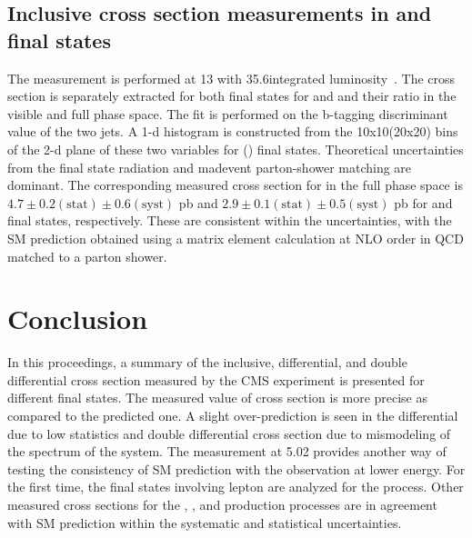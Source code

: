  \subsection{Inclusive \texorpdfstring{\ttbb}{ttbb} cross section measurements in \texorpdfstring{\ljets}{ljets} and \texorpdfstring{\dilep}{dilep} final states}
 The measurement is performed at 13 \TeV with 35.6\fbinv integrated luminosity~\cite{CMS:2020grm}. 
 The cross section is separately extracted for both final states for \ttbar and \ttjj and their ratio
 in the visible and full phase space. The fit is performed on the b-tagging discriminant value of 
 the two jets. A 1-d histogram is constructed from the 10x10(20x20) bins of the 2-d plane of these 
 two variables for \ljets (\dilep) final states. Theoretical uncertainties from the final state
 radiation and madevent parton-shower matching are dominant. The corresponding measured cross
 section for \ttbb in the full phase space is $4.7 \pm 0.2 (\text{stat}) \pm 0.6 (\text{syst})$ pb 
 and $2.9 \pm 0.1 (\text{stat}) \pm 0.5 (\text{syst})$ pb for \ljets and \dilep final states, 
 respectively. These are consistent within the uncertainties, with the SM prediction obtained using 
 a matrix element calculation at NLO order in QCD matched to a parton shower.

 \section{Conclusion}
 In this proceedings, a summary of the inclusive, differential, and double differential cross section
 measured by the CMS experiment is presented for different final states. The measured value of 
 \ttbar cross section is more precise as compared to the predicted one. A slight over-prediction
 is seen in the differential \ttgamma due to low statistics and double differential \ttbar cross 
 section due to mismodeling of the \pt spectrum of the \ttbar system. The \ttbar measurement at
 5.02 \TeV provides another way of testing the consistency of SM prediction with the observation
 at lower energy. For the first time, the final states involving \PGt lepton are analyzed for the
 \ttbar process. Other measured cross sections for the \PQt\PW, \ttgamma, \ttcc and \ttbb 
 production processes are in agreement with SM prediction within the systematic and statistical 
 uncertainties.

